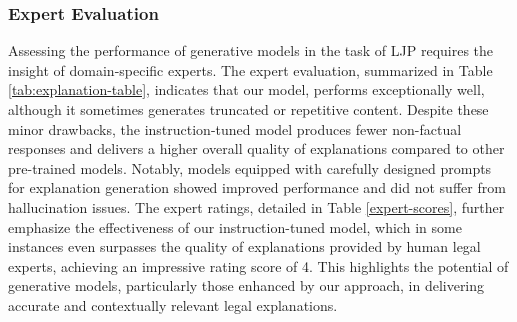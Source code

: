 \subsubsection{Expert Evaluation}
\label{subsec:expert_evaluation}
Assessing the performance of generative models in the task of LJP requires the insight of domain-specific experts. The expert evaluation, summarized in Table \ref{tab:explanation-table}, indicates that our \texttt{\namel} model, performs exceptionally well, although it sometimes generates truncated or repetitive content. Despite these minor drawbacks, the instruction-tuned model produces fewer non-factual responses and delivers a higher overall quality of explanations compared to other pre-trained models. Notably, models equipped with carefully designed prompts for explanation generation showed improved performance and did not suffer from hallucination issues. The expert ratings, detailed in Table \ref{expert-scores}, further emphasize the effectiveness of our instruction-tuned model, which in some instances even surpasses the quality of explanations provided by human legal experts, achieving an impressive rating score of 4. This highlights the potential of generative models, particularly those enhanced by our approach, in delivering accurate and contextually relevant legal explanations.

